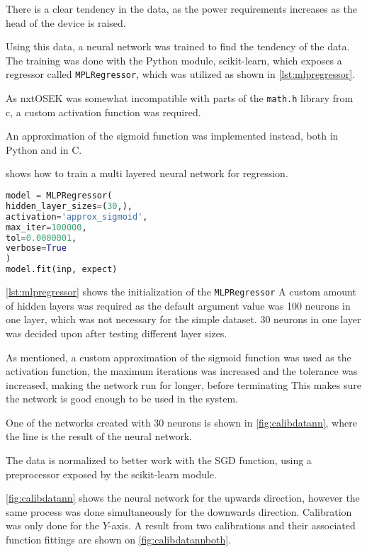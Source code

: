 
There is a clear tendency in the data, as the power requirements increases as the head of the device is raised.

Using this data, a neural network was trained to find the tendency of the data.
The training was done with the Python module, scikit-learn\cite{scikit-learn}, which exposes a regressor called \texttt{MPLRegressor}, which was utilized as shown in \autoref{lst:mlpregressor}.


As nxtOSEK was somewhat incompatible with parts of the \texttt{math.h} library from c, a custom activation function was required.

An approximation of the sigmoid function was implemented instead, both in Python and in C.

shows how to train a multi layered neural network for regression.

\begin{lstlisting}[language=python,label={lst:mlpregressor},caption={Training a MLPRegressor with scikit}]
model = MLPRegressor(
hidden_layer_sizes=(30,),
activation='approx_sigmoid',
max_iter=100000,
tol=0.0000001,
verbose=True
)
model.fit(inp, expect)

\end{lstlisting}

\autoref{lst:mlpregressor} shows the initialization of the \texttt{MLPRegressor} 
A custom amount of hidden layers was required as the default argument value was 100 neurons in one layer, which was not necessary for the simple dataset.
30 neurons in one layer was decided upon after testing different layer sizes.

As mentioned, a custom approximation of the sigmoid function was used as the activation function, the maximum iterations was increased and the tolerance was increased, making the network run for longer, before terminating
This makes sure the network is good enough to be used in the system.

One of the networks created with 30 neurons is shown in \autoref{fig:calibdatann}, where the line is the result of the neural network.

The data is normalized to better work with the SGD function, using a preprocessor exposed by the scikit-learn module.


\autoref{fig:calibdatann} shows the neural network for the upwards direction, however the same process was done simultaneously for the downwards direction.
Calibration was only done for the $Y$-axis.
A result from two calibrations and their associated function fittings are shown on \autoref{fig:calibdatannboth}.

